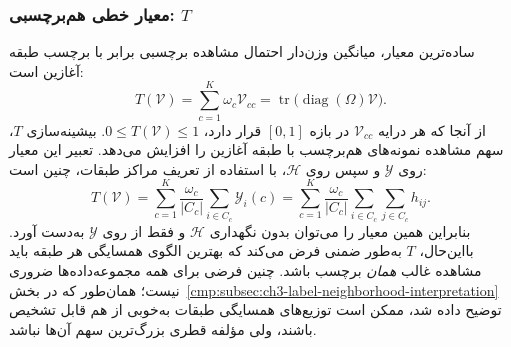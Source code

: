 \subsubsection{معیار خطی هم‌برچسبی: \texorpdfstring{$T$}{T}}
\label{cmp:subsubsec:ch3-T}
ساده‌ترین معیار، میانگین وزن‌دار احتمال مشاهده برچسبی برابر با برچسب طبقه آغازین است:
\begin{equation}\label{cmp:eq:ch3-T-on-V}
\boxed{T(\mathcal V)=\sum_{c=1}^{K}\omega_c\mathcal V_{cc}
=\operatorname{tr}\!\bigl(\operatorname{diag}(\Omega)\mathcal V\bigr).}
\end{equation}
از آنجا که هر درایه $\mathcal V_{cc}$ در بازه $[0,1]$ قرار دارد، $0\le T(\mathcal V)\le1$. بیشینه‌سازی $T$، سهم مشاهده نمونه‌های هم‌برچسب با طبقه آغازین را افزایش می‌دهد. تعبیر این معیار روی $\mathscr Y$ و سپس روی $\mathscr H$، با استفاده از تعریف مراکز طبقات، چنین است:
\begin{equation}\label{cmp:eq:ch3-T-on-Y-H}
T(\mathcal V)=
\sum_{c=1}^{K}\frac{\omega_c}{|C_c|}
\sum_{i\in C_c}\mathscr Y_i(c)
=
\sum_{c=1}^{K}\frac{\omega_c}{|C_c|}
\sum_{i\in C_c}\sum_{j\in C_c}h_{ij}.
\end{equation}
بنابراین همین معیار را می‌توان بدون نگهداری $\mathscr H$ و فقط از روی $\mathscr Y$ به‌دست آورد. بااین‌حال، $T$ به‌طور ضمنی فرض می‌کند که بهترین الگوی همسایگی هر طبقه باید مشاهده غالب \emph{همان} برچسب باشد. چنین فرضی برای همه مجموعه‌داده‌ها ضروری نیست؛ همان‌طور که در بخش~\ref{cmp:subsec:ch3-label-neighborhood-interpretation} توضیح داده شد، ممکن است توزیع‌های همسایگی طبقات به‌خوبی از هم قابل تشخیص باشند، ولی مؤلفه قطری بزرگ‌ترین سهم آن‌ها نباشد.

